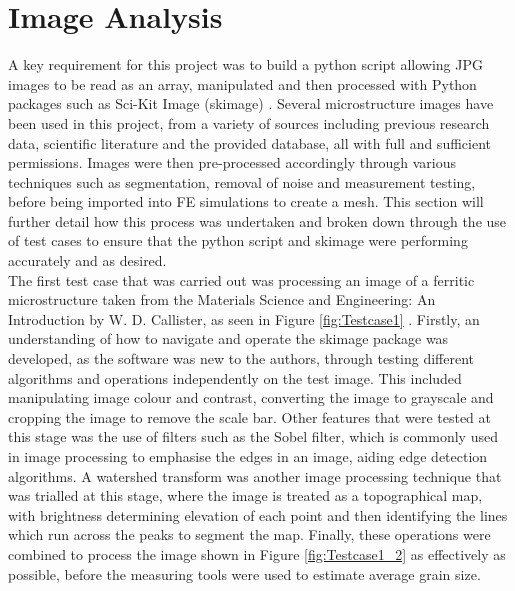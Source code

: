 \documentclass[\report.tex]{subfiles}
\begin{document}
\section{Image Analysis}
\noindent A key requirement for this project was to build a python script allowing JPG images to be read as an array, manipulated and then processed with Python packages such as Sci-Kit Image (skimage) \cite{scikitimage}. Several microstructure images have been used in this project, from a variety of sources including previous research data, scientific literature and the provided database, all with full and sufficient permissions. Images were then pre-processed accordingly through various techniques such as segmentation, removal of noise and measurement testing, before being imported into FE simulations to create a mesh. This section will further detail how this process was undertaken and broken down through the use of test cases to ensure that the python script and skimage were performing accurately and as desired.\\

\noindent The first test case that was carried out was processing an image of a ferritic microstructure taken from the Materials Science and Engineering: An Introduction by W. D. Callister, as seen in Figure \ref{fig:Testcase1} \cite{CallisterJrWilliamD2000MSaE}.
Firstly, an understanding of how to navigate and operate the skimage package was developed, as the software was new to the authors, through testing different algorithms and operations independently on the test image. This included manipulating image colour and contrast, converting the image to grayscale and cropping the image to remove the scale bar. Other features that were tested at this stage was the use of filters such as the Sobel filter, which is commonly used in image processing to emphasise the edges in an image, aiding edge detection algorithms.
A watershed transform was another image processing technique that was trialled at this stage, where the image is treated as a topographical map, with brightness determining elevation of each point and then identifying the lines which run across the peaks to segment the map. Finally, these operations were combined to process the image shown in Figure \ref{fig:Testcase1_2} as effectively as possible, before the measuring tools were used to estimate average grain size.\\
\end{document}
